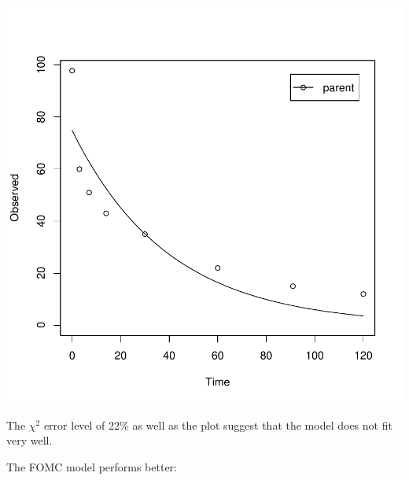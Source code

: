\documentclass[12pt,a4paper]{article}
\begin{document}
\includegraphics{examples-L3_SFO}

The $\chi^2$ error level of 22\% as well as the plot suggest that the model
does not fit very well. 

The FOMC model performs better:
\end{document}
